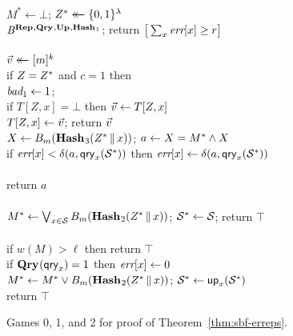 \begin{figure*}
{
  \vspace{-7pt}
  \hfill {}\\[2pt]
    $M^* \gets \bot$;
    $Z^* \mathrel{\leftarrow\mkern-14mu\leftarrow} \{0,1\}^\lambda$\\
    $\mathit{B}^{\textup{\textbf{Rep}}\hspace{0.5pt},\textup{\textbf{Qry}}\hspace{0.5pt},\textup{\textbf{Up}}\hspace{0.5pt},\textup{\textbf{Hash}}\hspace{0.5pt}_1}$;
    return $\big[\sum_x \textit{err}[x] \geq r\big]$
  \\[6pt]
  \\[2pt]
    $\vec{v} \mathrel{\leftarrow\mkern-14mu\leftarrow} [m]^k$\\
    if $Z=Z^*$ and $c = 1$ then \\
    \tab $\textit{bad}_1 \gets 1$; \\
    if $T[Z,x] = \bot$ then $\vec{v} \gets T[Z,x]$\\
    $T[Z,x] \gets \vec{v}$; return $\vec{v}$
}
{
  \\[2pt]
    $X \gets {B}_m(\textup{\textbf{Hash}}\hspace{0.5pt}_3(Z^* \, \| \, x))$;
    $a \gets X = M^* \wedge X$\\
    if $\textit{err}[x] < \delta(a,\mathsf{qry}_x(\mathcal{S}^*))$ then
          $\textit{err}[x] \gets \delta(a,\mathsf{qry}_x(\mathcal{S}^*))$\\
    \\
    return $a$
  \\[6pt]
  \oraclev{$\REPO(\col)$}\\[2pt]
    $M^* \gets \bigvee_{x \in \mathcal{S}} {B}_m(\textup{\textbf{Hash}}\hspace{0.5pt}_2(Z^* \, \| \, x))$;
    $\mathcal{S}^* \gets \mathcal{S}$;
    return $\top$
  \\[6pt]
  \\[2pt]
    if $w(M) > \ell$ then return $\top$\\
    if $\textup{\textbf{Qry}}\hspace{0.5pt}(\mathsf{qry}_x) = 1$ then $\textit{err}[x] \gets 0$\\
    $M^* \gets M^* \vee {B}_m(\textup{\textbf{Hash}}\hspace{0.5pt}_2(Z^* \, \| \, x))$;
    $\mathcal{S}^* \gets \mathsf{up}_x(\mathcal{S}^*)$\\
    return $\top$
}
\caption{Games 0, 1, and 2 for proof of Theorem~\ref{thm:sbf-erreps}.}
\label{fig:sbf-erreps/games}
\end{figure*}

